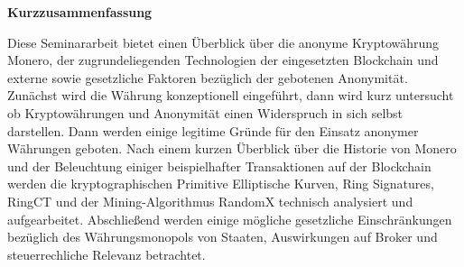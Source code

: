 \newpage

\vspace*{1cm}

\begin{center}
    \textbf{Kurzzusammenfassung}
\end{center}

\vspace*{1cm}

\noindent 
Diese Seminararbeit bietet einen Überblick über die anonyme Kryptowährung Monero, der zugrundeliegenden Technologien der eingesetzten Blockchain und externe sowie gesetzliche Faktoren bezüglich der gebotenen Anonymität. 
Zunächst wird die Währung konzeptionell eingeführt, dann wird kurz untersucht ob Kryptowährungen und Anonymität einen Widerspruch in sich selbst darstellen. Dann werden einige legitime Gründe für den Einsatz anonymer Währungen geboten.
Nach einem kurzen Überblick über die Historie von Monero und der Beleuchtung einiger beispielhafter Transaktionen auf der Blockchain
werden die kryptographischen Primitive Elliptische Kurven, Ring Signatures, RingCT und der Mining-Algorithmus RandomX technisch analysiert und aufgearbeitet.
Abschließend werden einige mögliche gesetzliche Einschränkungen bezüglich des Währungsmonopols von Staaten, Auswirkungen auf Broker und steuerrechliche Relevanz betrachtet.